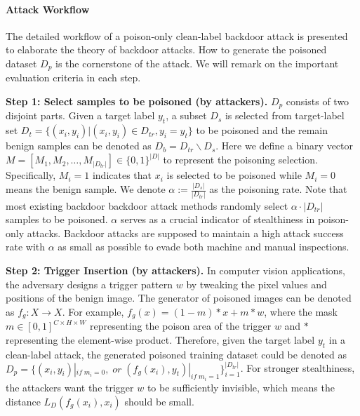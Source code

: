 \documentclass{article}
\begin{document}
\paragraph{Attack Workflow}
The detailed workflow of a poison-only clean-label backdoor attack is presented to elaborate the theory of backdoor attacks. How to generate the poisoned dataset \(D_{p}\) is the cornerstone of the attack. We will remark on the important evaluation criteria in each step.

\textbf{Step 1: Select samples to be poisoned (by attackers).} \(D_{p}\) consists of two disjoint parts. Given a target label \(y_t\), a subset \(D_s\) is selected from target-label set \(D_t = \{(x_i, y_i)| (x_i, y_i) \in D_{tr}, y_i = y_t\}\) to be poisoned and the remain benign samples can be denoted as \(D_b = D_{tr} \backslash D_s\). Here we define a binary vector \(M = [M_1,M_2,\ldots,M_{|D_{tr}|}] \in \{0,1\}^{|D|}\) to represent the poisoning selection. Specifically, \(M_i=1\) indicates that \(x_i\) is selected to be poisoned while \(M_i = 0\) means the benign sample. We denote \(\alpha := \frac{|D_s|}{|D_{tr}|}\) as the poisoning rate. Note that most existing backdoor backdoor attack methods randomly select \(\alpha \cdot |D_{tr}|\) samples to be poisoned. \(\alpha\) serves as a crucial indicator of stealthiness in poison-only attacks. Backdoor attacks are supposed to maintain a high attack success rate with \(\alpha\) as small as possible to evade both machine and manual inspections.

\textbf{Step 2: Trigger Insertion (by attackers).}  In computer vision applications, the adversary designs a trigger pattern \(w\) by tweaking the pixel values and positions of the benign image. The generator of poisoned images can be denoted as \(f_g:X \to X\). For example, \(f_g(x) = (1-m)*x + m*w\), where the mask \(m \in [0,1]^{C \times H \times W }\) representing the poison area of the trigger \(w\) and \(*\) representing the element-wise product. Therefore, given the target label \(y_t\) in a clean-label attack, the generated poisoned training dataset could be denoted as \(D_p = \{(x_i,y_i)|_{if\;m_i = 0}, \; or \;(f_g(x_i), y_t)|_{if\;m_i = 1}\}_{i=1}^{|D_{tr}|}\). For stronger stealthiness, the attackers want the trigger \(w\) to be sufficiently invisible, which means the distance \(L_D(f_g(x_i),x_i)\) should be small.
\end{document}

